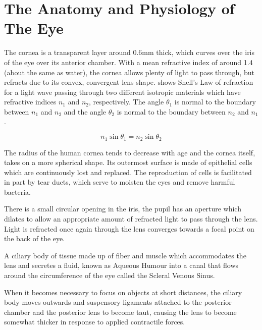 
\chapter{The Anatomy and Physiology of The Eye}

\label{anatomy}

The cornea is a transparent layer around 0.6mm thick, which curves over the
iris of the eye over its anterior chamber.
\cite{yaylali1997corneal,thoft1983x,patel1994refractive}
With a mean refractive index of around 1.4 (about the same as water),
the cornea allows plenty of light to pass through, but refracts due to
 its convex, convergent lens shape.  shows Snell's
 Law of refraction for a light wave passing through two different isotropic
 materials which have refractive indices $n_1$ and $n_2$,
respectively. The angle $\theta_1$ is normal to the boundary between $n_1$
and $n_2$ and the angle $\theta_2$ is normal to the boundary between $n_2$
and $n_1$.

\begin{equation}
n_1\sin\theta_1=n_2\sin\theta_2
\label{eq:refractive}
\end{equation}

The radius of the human cornea tends to decrease with age and the cornea
itself, takes on a more spherical shape.\cite{guirao2000optical} Its
outermost surface is made of epithelial cells which are continuously lost
and replaced.\cite{jester1999cellular,hassell2010molecular} The reproduction
of cells is facilitated in part by tear ducts, which  serve to moisten the
eyes and remove harmful bacteria.\cite{holly1977tear}

There is a small circular opening in the iris, the pupil has an aperture which dilates to allow an appropriate amount of refracted light to pass through the lens. Light is refracted once again through the lens converges towards a focal point on the back of the eye. 


A ciliary body of tissue made up of fiber and muscle which accommodates the lens and secretes a fluid, known as Aqueous Humour into a canal that flows
around the circumference of the eye called the Scleral Venous Sinus.\cite{bill1970effects,dvorak1934schlemm}

When it becomes necessary to focus on objects at short distances, the ciliary body moves outwards and suspensory ligaments attached to the posterior chamber and the posterior lens to become taut, causing the lens to become somewhat thicker in response to applied contractile forces.\cite{atchison1995accommodation}

